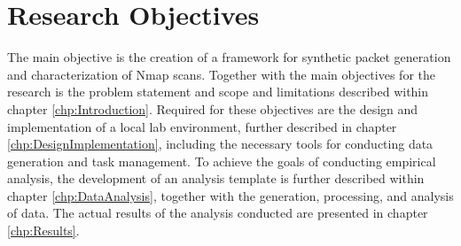 \section{Research Objectives}
\label{s:ConclusionResearchObjectives}
The main objective is the creation of a framework for synthetic packet generation and characterization of Nmap scans.
Together with the main objectives for the research is the problem statement and scope and limitations described within chapter \ref{chp:Introduction}.
Required for these objectives are the design and implementation of a local lab environment, further described in chapter \ref{chp:DesignImplementation}, including the necessary tools for conducting data generation and task management.
To achieve the goals of conducting empirical analysis, the development of an analysis template is further described within chapter \ref{chp:DataAnalysis}, together with the generation, processing, and analysis of data.
The actual results of the analysis conducted are presented in chapter \ref{chp:Results}.
